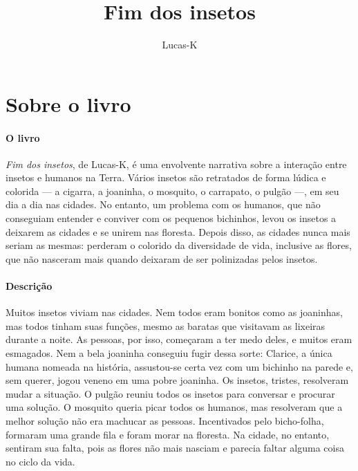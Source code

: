 \documentclass[11pt]{extarticle}
\newcommand{\AutorLivro}{Lucas-K}
\newcommand{\TituloLivro}{Fim dos insetos}
\newcommand{\colaborador}{{Paulo Pompermaier e Renier Silva}}
\begin{document}
\title{\TituloLivro}
\author{\AutorLivro}
\def\authornotes{\colaborador}

\date{}
\maketitle


\tableofcontents



\section{Sobre o livro}

\paragraph{O livro} \textit{Fim dos insetos}, de Lucas-K, é uma envolvente narrativa sobre a interação entre insetos e humanos na Terra. Vários insetos são retratados de forma lúdica e colorida --- a cigarra, a joaninha, o mosquito, o carrapato, o pulgão ---, em seu dia a dia nas cidades. No entanto, um problema com os humanos, que não conseguiam entender e conviver com os pequenos bichinhos, levou os insetos a deixarem as cidades e se unirem nas floresta. Depois disso, as cidades nunca mais seriam as mesmas: perderam o colorido da diversidade de vida, inclusive as flores, que não nasceram mais quando deixaram de ser polinizadas pelos insetos.

\paragraph{Descrição} Muitos insetos viviam nas cidades. Nem todos eram bonitos como as joaninhas, mas todos tinham suas funções, mesmo as baratas que visitavam as lixeiras durante a noite. As pessoas, por isso, começaram a ter medo deles, e muitos eram esmagados. Nem a bela joaninha conseguiu fugir dessa sorte: Clarice, a única humana nomeada na história, assustou-se certa vez com um bichinho na parede e, sem querer, jogou veneno em uma pobre joaninha. Os insetos, tristes, resolveram mudar a situação. O pulgão reuniu todos os insetos para conversar e procurar uma solução. O mosquito queria picar todos os humanos, mas resolveram que a melhor solução não era machucar as pessoas. Incentivados pelo bicho-folha, formaram uma grande fila e foram morar na floresta. Na cidade, no entanto, sentiram sua falta, pois as flores não mais nasciam e parecia faltar alguma coisa no ciclo da vida.
\end{document}
